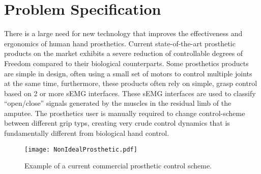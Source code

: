 \documentclass[../main.tex]{subfiles}
\begin{document}
\section{Problem Specification}

There is a large need for new technology that improves the effectiveness and ergonomics of human hand prosthetics.
Current state-of-the-art prosthetic products on the market exhibits a severe reduction of controllable degrees of Freedom compared to their biological counterparts.
Some prosthetics products are simple in design, often using a small set of motors to control multiple joints at the same time, furthermore, these products often rely on simple, grasp control based on 2 or more \gls{sEMG} interfaces.
These \gls{sEMG} interfaces are used to classify ``open/close'' signals generated by the muscles in the residual limb of the amputee.
The prosthetics user is manually required to change control-scheme between different grip typs, creating very crude control dynamics that is fundamentally different from biological hand control.

\begin{figure}[H]
\begin{center}
\texttt{[image: NonIdealProsthetic.pdf]}
\caption{Example of a current commercial prosthetic control scheme.}
\label{fig:nonidealprosthetic}
\end{center}
\end{figure}

\end{document}

